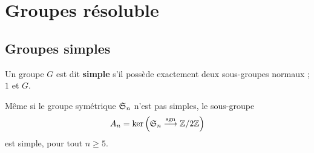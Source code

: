 \chapter{Groupes résoluble}

\section{Groupes simples}

\begin{definition}
	Un groupe $G$ est dit \textbf{simple} s'il possède exactement deux sous-groupes normaux ; $1$ et $G$.
\end{definition}


\begin{theoreme}
	Même si le groupe symétrique $\S_n$ n'est pas simples, le sous-groupe  
	\[
	A_n = \ker \Big(\S_n \overset{\mathrm{sgn}}{\longrightarrow} \zn 2\Big)
	\]
	est simple, pour tout $n \geqslant 5$.
\end{theoreme}

